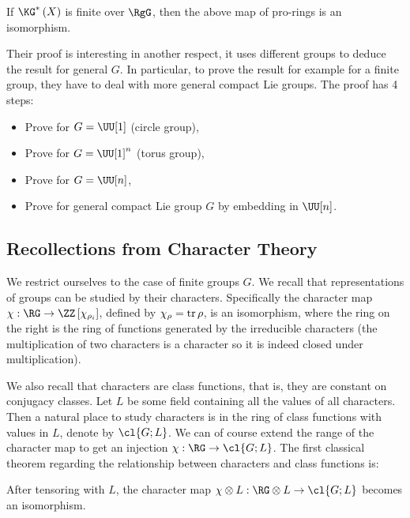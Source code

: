 \begin{theorem}[{\cite{AS}}]
	If $\KG^*\left(X\right)$ is finite over $\RgG$, then the above map of pro-rings is an isomorphism.
\end{theorem}

Their proof is interesting in another respect, it uses different groups to deduce the result for general $G$.
In particular, to prove the result for example for a finite group, they have to deal with more general compact Lie groups.
The proof has 4 steps:
\begin{itemize}
	\item Prove for $G = \UU[1]$ (circle group),
	\item Prove for $G = \UU[1]^n$ (torus group),
	\item Prove for $G = \UU[n]$,
	\item Prove for general compact Lie group $G$ by embedding in $\UU[n]$.
\end{itemize}



\subsection{Recollections from Character Theory}

We restrict ourselves to the case of finite groups $G$.
We recall that representations of groups can be studied by their characters.
Specifically the character map $\chi: \RG \to \ZZ\left[\chi_{\rho_i}\right]$, defined by $\chi_\rho = \operatorname{tr} \rho$, is an isomorphism, where the ring on the right is the ring of functions generated by the irreducible characters (the multiplication of two characters is a character so it is indeed closed under multiplication).

We also recall that characters are class functions, that is, they are constant on conjugacy classes.
Let $L$ be some field containing all the values of all characters.
Then a natural place to study characters is in the ring of class functions with values in $L$, denote by $\cl{G;L}$.
We can of course extend the range of the character map to get an injection $\chi: \RG \to \cl{G;L}$.
The first classical theorem regarding the relationship between characters and class functions is:

\begin{theorem}\label{char-1}
	After tensoring with $L$, the character map $\chi \otimes L: \RG \otimes L \to \cl{G; L}$ becomes an isomorphism.
\end{theorem}

